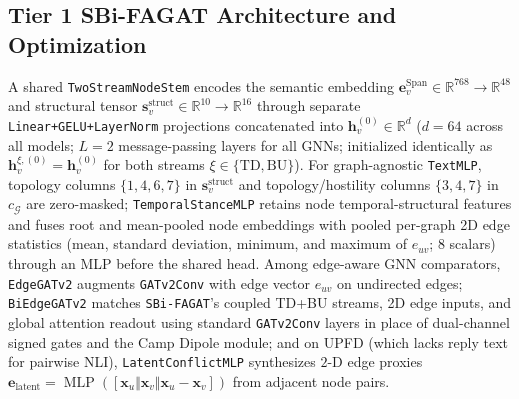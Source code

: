 \documentclass[conference]{IEEEtran}
\begin{document}
\subsection{Tier 1 SBi-FAGAT Architecture and Optimization}
A shared \texttt{TwoStreamNodeStem} encodes the semantic embedding $\mathbf{e}_v^{\text{Span}} \in \mathbb{R}^{768} \to \mathbb{R}^{48}$ and structural tensor $\mathbf{s}_v^{\text{struct}} \in \mathbb{R}^{10} \to \mathbb{R}^{16}$ through separate \texttt{Linear+GELU+LayerNorm} projections concatenated into $\mathbf{h}_v^{(0)} \in \mathbb{R}^{d}$ ($d=64$ across all models; $L=2$ message-passing layers for all GNNs; initialized identically as $\mathbf{h}_v^{\xi,(0)} = \mathbf{h}_v^{(0)}$ for both streams $\xi \in \{\text{TD}, \text{BU}\}$). For graph-agnostic \texttt{TextMLP}, topology columns $\{1, 4, 6, 7\}$ in $\mathbf{s}_v^{\text{struct}}$ and topology/hostility columns $\{3, 4, 7\}$ in $c_{\mathcal{G}}$ are zero-masked; \texttt{TemporalStanceMLP} retains node temporal-structural features and fuses root and mean-pooled node embeddings with pooled per-graph 2D edge statistics (mean, standard deviation, minimum, and maximum of $e_{uv}$; $8$ scalars) through an MLP before the shared head. Among edge-aware GNN comparators, \texttt{EdgeGATv2} augments \texttt{GATv2Conv} with edge vector $e_{uv}$ on undirected edges; \texttt{BiEdgeGATv2} matches \texttt{SBi-FAGAT}'s coupled TD+BU streams, 2D edge inputs, and global attention readout using standard \texttt{GATv2Conv} layers in place of dual-channel signed gates and the Camp Dipole module; and on UPFD (which lacks reply text for pairwise NLI), \texttt{LatentConflictMLP} synthesizes $2$-D edge proxies $\mathbf{e}_{\text{latent}} = \operatorname{MLP}([\mathbf{x}_u \Vert \mathbf{x}_v \Vert \mathbf{x}_u - \mathbf{x}_v])$ from adjacent node pairs.
\end{document}
